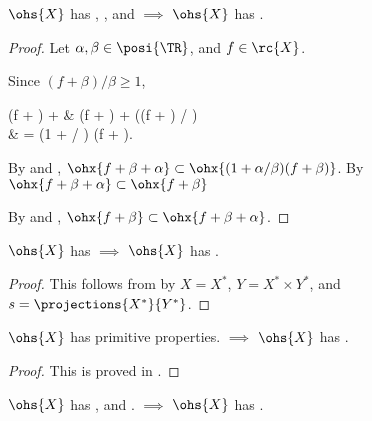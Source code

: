 \documentclass[b5paper, english, oneside]{memoir}
\begin{document}
\begin{theorem}
\label{TranslationInvarianceIsImplied}
$\ohs{X}$ has , , and  $\implies$ $\ohs{X}$ has .
\end{theorem}

\begin{proof}
Let $\alpha, \beta \in \posi{\TR}$, and $f \in \rc{X}$.

\proofpart{$\subset$}
Since $(f + \beta) / \beta \geq 1$,
\begin{eqs}
(f + \beta) + \alpha & \leq (f + \beta) + \alpha ((f + \beta) / \beta) \\
{} & = (1 + \alpha / \beta) (f + \beta).
\end{eqs}
By  and , $\ohx{f + \beta + \alpha} \subset \ohx{(1 + \alpha / \beta)(f + \beta)}$. By  $\ohx{f + \beta + \alpha} \subset \ohx{f + \beta}$

\proofpart{$\supset$}
By  and , $\ohx{f + \beta} \subset \ohx{f + \beta + \alpha}$.

\end{proof}





\begin{theorem}
\label{ExtensibilityIsImplied}
$\ohs{X}$ has  $\implies$ $\ohs{X}$ has .
\end{theorem}

\begin{proof}
This follows from  by $X = X^*$, $Y = X^* \times Y^*$, and $s = \projections{X^*}{Y^*}$. 
\end{proof}

\begin{theorem}
\label{SubsetSumIsImplied}
$\ohs{X}$ has primitive properties.  $\implies$ $\ohs{X}$ has .
\end{theorem}

\begin{proof}
This is proved in .
\end{proof}

\begin{theorem}
\label{SubsetSumImpliesSubComposability}
$\ohs{X}$ has ,  and .  $\implies$ $\ohs{X}$ has .
\end{theorem}
\end{document}
